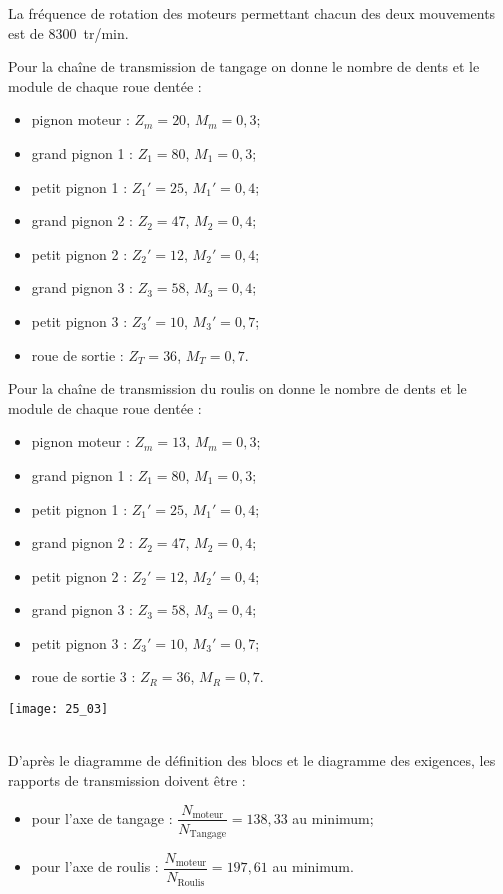 La fréquence de rotation des moteurs permettant chacun des deux mouvements est de \SI{8300}{tr/min}.
\begin{multicols}{2}
Pour la chaîne de transmission de tangage on donne  le nombre de dents et le module de chaque roue dentée : 
\begin{itemize}
\item pignon moteur : $Z_m=20$, $M_m=0,3$;
\item grand pignon 1 : $Z_1 = 80$, $M_1=0,3$;
\item petit pignon 1 : $Z_1' = 25$, $M_1'=0,4$;
\item grand pignon 2 : $Z_2 = 47$, $M_2=0,4$;
\item petit pignon 2 : $Z_2' = 12$, $M_2'=0,4$;
\item grand pignon 3 : $Z_3 = 58$, $M_3=0,4$;
\item petit pignon 3 : $Z_3' = 10$, $M_3'=0,7$;
\item roue de sortie : $Z_T = 36$, $M_T=0,7$.
\end{itemize}


Pour la chaîne de transmission du roulis on donne le nombre de dents et le module de chaque roue dentée : 
\begin{itemize}
\item pignon moteur : $Z_m=13$, $M_m=0,3$;
\item grand pignon 1 : $Z_1 = 80$, $M_1=0,3$;
\item petit pignon 1 : $Z_1' = 25$, $M_1'=0,4$;
\item grand pignon 2 : $Z_2 = 47$, $M_2=0,4$;
\item petit pignon 2 : $Z_2' = 12$, $M_2'=0,4$;
\item grand pignon 3 : $Z_3 = 58$, $M_3=0,4$;
\item petit pignon 3 : $Z_3' = 10$, $M_3'=0,7$;
\item roue de sortie 3 : $Z_R = 36$, $M_R=0,7$.
\end{itemize}
\end{multicols}


\begin{marginfigure}
\texttt{[image: 25\_03]}
\end{marginfigure}
\fi



\ifprof~\\
D'après le diagramme de définition des blocs et le diagramme des exigences, les rapports de transmission doivent être : 
\begin{itemize}
\item pour l'axe de tangage : $\dfrac{N_{\text{moteur}}}{N_{\text{Tangage}}}=138,33$ au minimum; 
\item pour l'axe de roulis :  $\dfrac{N_{\text{moteur}}}{N_{\text{Roulis}}}= 197,61$ au minimum.
\end{itemize}
\else
\fi


